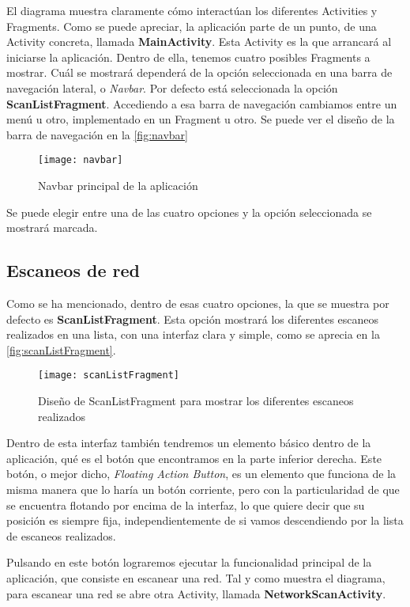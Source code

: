 El diagrama muestra claramente cómo interactúan los diferentes Activities y Fragments.  Como se puede apreciar, la aplicación parte de un punto, de una Activity concreta, llamada \textbf{MainActivity}. Esta Activity es la que arrancará al iniciarse la aplicación. Dentro de ella, tenemos cuatro posibles Fragments a mostrar. Cuál se mostrará dependerá de la opción seleccionada en una barra de navegación lateral, o \textit{Navbar}. Por defecto está seleccionada la opción \textbf{ScanListFragment}. Accediendo a esa barra de navegación cambiamos entre un menú u otro, implementado en un Fragment u otro. Se puede ver el diseño de la barra de navegación en la \autoref{fig:navbar}

\begin{figure}[H]
	\centering
	\texttt{[image: navbar]}
	\caption{Navbar principal de la aplicación}
	\label{fig:navbar}
\end{figure}

Se puede elegir entre una de las cuatro opciones y la opción seleccionada se mostrará marcada.

\subsection{Escaneos de red}

Como se ha mencionado, dentro de esas cuatro opciones, la que se muestra por defecto es \textbf{ScanListFragment}. Esta opción mostrará los diferentes escaneos realizados en una lista, con una interfaz clara y simple, como se aprecia en la \autoref{fig:scanListFragment}.

\begin{figure}[H]
	\centering
	\texttt{[image: scanListFragment]}
	\caption{Diseño de ScanListFragment para mostrar los diferentes escaneos realizados}
	\label{fig:scanListFragment}
\end{figure}

Dentro de esta interfaz también tendremos un elemento básico dentro de la aplicación, qué es el botón que encontramos en la parte inferior derecha. Este botón, o mejor dicho, \textit{Floating Action Button}, es un elemento que funciona de la misma manera que lo haría un botón corriente, pero con la particularidad de que se encuentra flotando por encima de la interfaz, lo que quiere decir que su posición es siempre fija, independientemente de si vamos descendiendo por la lista de escaneos realizados.

Pulsando en este botón lograremos ejecutar la funcionalidad principal de la aplicación, que consiste en escanear una red. Tal y como muestra el diagrama, para escanear una red se abre otra Activity, llamada \textbf{NetworkScanActivity}.

